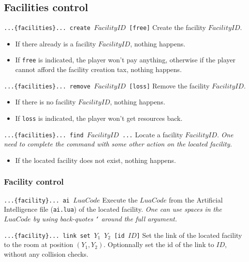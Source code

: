 \documentclass[10pt,a4paper]{scrartcl}
\newenvironment{apiCode}[1]
{ \begin{lrbox}{\mybox} \begin{minipage}{0.9\textwidth} {\color{Mahogany} \small\texttt{#1}} \vspace{8pt} \newline }
{ \end{minipage} \end{lrbox}\fbox{\usebox{\mybox}} \newline\vspace{4pt}\newline }
\begin{document}
\subsection{Facilities control}
\begin{apiCode}{...\{facilities\}... create $FacilityID$ [free]}
Create the facility $FacilityID$.
\begin{itemize}
\itemsep 0em
\item If there already is a facility $FacilityID$, nothing happens.
\item If \verb#free# is indicated, the player won't pay anything,\newline
	  otherwise if the player cannot afford the facility creation tax, nothing happens.
\end{itemize}
\end{apiCode}
\begin{apiCode}{...\{facilities\}... remove $FacilityID$ [loss]}
Remove the facility $FacilityID$.
\begin{itemize}
\itemsep 0em
\item If there is no facility $FacilityID$, nothing happens.
\item If \verb#loss# is indicated, the player won't get resources back.
\end{itemize}
\end{apiCode}
\begin{apiCode}{...\{facilities\}... find $FacilityID$ ...}
Locate a facility $FacilityID$.\newline
\textit{One need to complete the command with some other action on the located facility.}
\begin{itemize}
\itemsep 0em
\item If the located facility does not exist, nothing happens.
\end{itemize}
\end{apiCode}

\subsubsection*{Facility control}
\begin{apiCode}{...\{facility\}... ai $LuaCode$}
Execute the $LuaCode$ from the Artificial Intelligence file (\texttt{ai.lua}) of the located facility.\newline
\textit{One can use spaces in the $LuaCode$ by using back-quotes \texttt{`} around the full argument.}
\end{apiCode}
\begin{apiCode}{...\{facility\}... link set $Y_1$ $Y_2$ [id $ID$]}
Set the link of the located facility to the room at position $(Y_1, Y_2)$.
Optionnally set the id of the link to $ID$, without any collision checks.
\end{apiCode}
\end{document}
